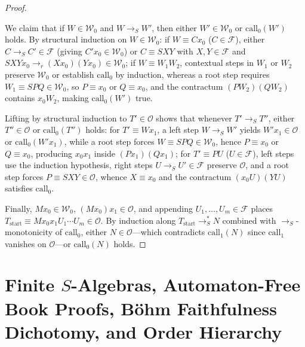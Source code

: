\documentclass[11pt,reqno]{amsart}
\numberwithin{equation}{section}
\theoremstyle{plain}
\theoremstyle{definition}
\theoremstyle{remark}
\newcommand{\redS}{\to_S}
\newcommand{\redSs}{\to_S^*}
\begin{document}
\begin{proof}
\begin{itemize}[leftmargin=2.0em]
\end{itemize}
We claim that if $W \in \mathcal{W}_0$ and $W \redS W'$, then either $W' \in \mathcal{W}_0$ or $\mathrm{call}_0(W')$ holds. By structural induction on $W \in \mathcal{W}_0$: if $W \equiv C x_0$ ($C \in \mathcal{F}$), either $C \redS C' \in \mathcal{F}$ (giving $C' x_0 \in \mathcal{W}_0$) or $C \equiv S X Y$ with $X, Y \in \mathcal{F}$ and $S X Y x_0 \to_r (X x_0)(Y x_0) \in \mathcal{W}_0$; if $W \equiv W_1 W_2$, contextual steps in $W_1$ or $W_2$ preserve $\mathcal{W}_0$ or establish $\mathrm{call}_0$ by induction, whereas a root step requires $W_1 \equiv S P Q \in \mathcal{W}_0$, so $P \equiv x_0$ or $Q \equiv x_0$, and the contractum $(P W_2)(Q W_2)$ contains $x_0 W_2$, making $\mathrm{call}_0(W')$ true.

Lifting by structural induction to $T' \in \mathcal{O}$ shows that whenever $T' \redS T''$, either $T'' \in \mathcal{O}$ or $\mathrm{call}_0(T'')$ holds: for $T' \equiv W x_1$, a left step $W \redS W'$ yields $W' x_1 \in \mathcal{O}$ or $\mathrm{call}_0(W' x_1)$, while a root step forces $W \equiv S P Q \in \mathcal{W}_0$, hence $P \equiv x_0$ or $Q \equiv x_0$, producing $x_0 x_1$ inside $(P x_1)(Q x_1)$; for $T' \equiv P U$ ($U \in \mathcal{F}$), left steps use the induction hypothesis, right steps $U \redS U' \in \mathcal{F}$ preserve $\mathcal{O}$, and a root step forces $P \equiv S X Y \in \mathcal{O}$, whence $X \equiv x_0$ and the contractum $(x_0 U)(Y U)$ satisfies $\mathrm{call}_0$.

Finally, $M x_0 \in \mathcal{W}_0$, $(M x_0) x_1 \in \mathcal{O}$, and appending $U_1, \dots, U_m \in \mathcal{F}$ places $T_{\mathrm{start}} \equiv M x_0 x_1 U_1\cdots U_m \in \mathcal{O}$. By induction along $T_{\mathrm{start}} \redSs N$ combined with $\redS$-monotonicity of $\mathrm{call}_0$, either $N \in \mathcal{O}$---which contradicts $\mathrm{call}_1(N)$ since $\mathrm{call}_1$ vanishes on $\mathcal{O}$---or $\mathrm{call}_0(N)$ holds.
\end{proof}


\section{Finite \texorpdfstring{$S$}{S}-Algebras, Automaton-Free Book Proofs, B\"ohm Faithfulness Dichotomy, and Order Hierarchy}\label{sec:algebras}
\end{document}

